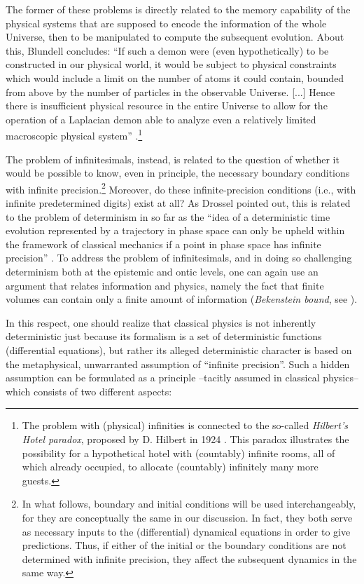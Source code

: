 \documentclass[12pt]{article}
\begin{document}
The former of these problems is directly related to the memory capability of the physical systems that are supposed to encode the information of the whole Universe, then to be manipulated to compute the subsequent evolution. About this, Blundell concludes: ``If such a demon were (even hypothetically) to be constructed in our physical world, it would be subject to physical constraints which would include a limit on the number of atoms it could contain, bounded from above by the number of particles in the observable Universe. [...] Hence there is insufficient physical resource in the entire Universe to allow for the operation of a Laplacian demon able to analyze even a relatively limited macroscopic physical system'' \cite{blundell}.\footnote{The problem with (physical) infinities is connected to the so-called \emph{Hilbert's Hotel paradox}, proposed by D. Hilbert in 1924 \cite{hilbert}. This paradox illustrates the possibility for a hypothetical hotel with (countably) infinite rooms, all of which already occupied, to allocate (countably) infinitely many more guests.}

The problem of infinitesimals, instead, is related to the question of whether it would be possible to know, even in principle, the necessary boundary conditions with infinite precision.\footnote{In what follows, boundary and initial conditions will be used interchangeably, for they are conceptually the same in our discussion. In fact, they both serve as necessary inputs to the (differential) dynamical equations in order to give predictions. Thus, if either of the initial or the boundary conditions are not determined with infinite precision, they affect the subsequent dynamics in the same way.} Moreover, do these infinite-precision conditions (i.e., with infinite predetermined digits) exist at all?  As Drossel pointed out, this is related to the problem of determinism in so far as the  ``idea of a deterministic time evolution represented by a trajectory in phase space can only be upheld within the framework of classical mechanics if a point in phase space has infinite precision'' \cite{drossel}. To address the problem of infinitesimals, and in doing so challenging determinism both at the epistemic and ontic levels, one can again use an argument that relates information and physics, namely the fact that finite volumes can contain only a finite amount of information (\emph{Bekenstein bound}, see \cite{gisin1}).

In this respect, one should realize that classical physics is not inherently deterministic just because its formalism is a set of deterministic functions (differential equations), but rather its alleged deterministic character is based on the metaphysical, unwarranted assumption of ``infinite precision''. Such a hidden assumption can be formulated as a principle  --tacitly assumed in classical physics-- which consists of two different aspects:
\end{document}
